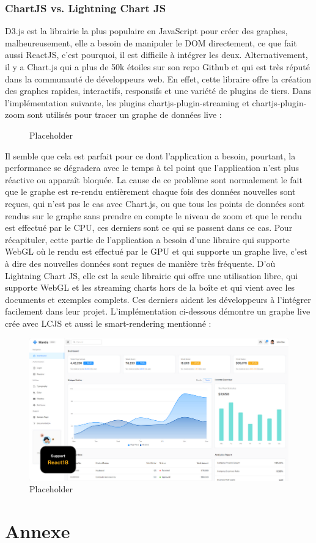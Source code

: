 \documentclass{template}
\begin{document}
\subsubsection{ChartJS vs. Lightning Chart JS}
D3.js \cite{d3jsObservableJavaScript} est la librairie la plus populaire en JavaScript pour créer des graphes, malheureusement, elle a besoin de manipuler le DOM directement, ce que fait aussi ReactJS, c'est pourquoi, il est difficile à intégrer les deux. Alternativement, il y a Chart.js \cite{chartjsChartjs} qui a plus de 50k étoiles sur son repo Github et qui est très réputé dans la communauté de développeurs web. En effet, cette libraire offre la création des graphes rapides, interactifs, responsifs et une variété de plugins de tiers. Dans l'implémentation suivante, les plugins chartjs-plugin-streaming \cite{nagixChartjspluginstreamingDocumentation} et chartjs-plugin-zoom \cite{chartjsChartjspluginzoom} sont utilisés pour tracer un graphe de données live : 
\begin{figure}[h!]
    \centering
    \caption{Placeholder}
\end{figure}
Il semble que cela est parfait pour ce dont l'application a besoin, pourtant, la performance se dégradera avec le temps à tel point que l'application n'est plus réactive ou apparaît bloquée. La cause de ce problème sont normalement le fait que le graphe est re-rendu entièrement chaque fois des données nouvelles sont reçues, qui n'est pas le cas avec Chart.js, ou que tous les points de données sont rendus sur le graphe sans prendre en compte le niveau de zoom et que le rendu est effectué par le CPU, ces derniers sont ce qui se passent dans ce cas. Pour récapituler, cette partie de l'application a besoin d'une libraire qui supporte WebGL où le rendu est effectué par le GPU et qui supporte un graphe live, c'est à dire des nouvelles données sont reçues de manière très fréquente. D'où Lightning Chart JS, elle est la seule librairie qui offre une utilisation libre, qui supporte WebGL et les streaming charts hors de la boîte et qui vient avec les documents et exemples complets. Ces derniers aident les développeurs à l'intégrer facilement dans leur projet. L'implémentation ci-dessous démontre un graphe live crée avec LCJS et aussi le smart-rendering mentionné :  
\begin{figure}[h!]
    \includegraphics[scale=0.3]{Pics/mantis.png}
    \centering
    \caption{Placeholder}
\end{figure}
\newpage

\printbibliography

\newpage
\section*{Annexe}
\end{document}
